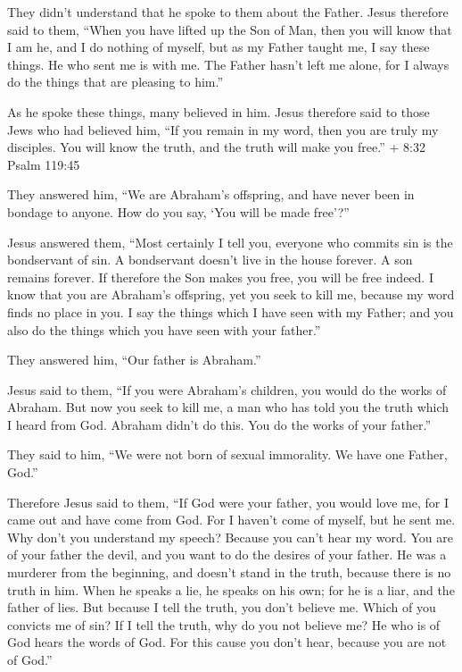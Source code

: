  They didn't understand that he spoke to them about the
Father.  Jesus therefore said to them, ``When you have
lifted up the Son of Man, then you will know that I am he, and I do
nothing of myself, but as my Father taught me, I say these things.
 He who sent me is with me. The Father hasn't left me
alone, for I always do the things that are pleasing to him.''

 As he spoke these things, many believed in him.
 Jesus therefore said to those Jews who had believed him,
``If you remain in my word, then you are truly my disciples.
 You will know the truth, and the truth will make you
free.'' + 8:32 Psalm 119:45

 They answered him, ``We are Abraham's offspring, and have
never been in bondage to anyone. How do you say, `You will be made
free'?''

 Jesus answered them, ``Most certainly I tell you, everyone
who commits sin is the bondservant of sin.  A bondservant
doesn't live in the house forever. A son remains forever. 
If therefore the Son makes you free, you will be free indeed.
 I know that you are Abraham's offspring, yet you seek to
kill me, because my word finds no place in you.  I say the
things which I have seen with my Father; and you also do the things
which you have seen with your father.''

 They answered him, ``Our father is Abraham.''

Jesus said to them, ``If you were Abraham's children, you would do the
works of Abraham.  But now you seek to kill me, a man who
has told you the truth which I heard from God. Abraham didn't do this.
 You do the works of your father.''

They said to him, ``We were not born of sexual immorality. We have one
Father, God.''

 Therefore Jesus said to them, ``If God were your father,
you would love me, for I came out and have come from God. For I haven't
come of myself, but he sent me.  Why don't you understand
my speech? Because you can't hear my word.  You are of your
father the devil, and you want to do the desires of your father. He was
a murderer from the beginning, and doesn't stand in the truth, because
there is no truth in him. When he speaks a lie, he speaks on his own;
for he is a liar, and the father of lies.  But because I
tell the truth, you don't believe me.  Which of you
convicts me of sin? If I tell the truth, why do you not believe me?
 He who is of God hears the words of God. For this cause
you don't hear, because you are not of God.''

